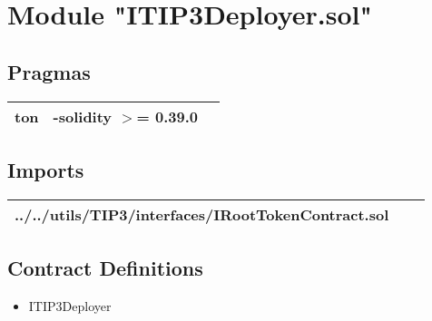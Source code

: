 
\section{Module "ITIP3Deployer.sol"}


\subsection{Pragmas}


\noindent\begin{tabular}{|l|l|p{5cm}|}\hline
ton & -solidity $>$= 0.39.0 &\\\hline
\end{tabular}


\subsection{Imports}


\noindent\begin{tabular}{|l|l|p{5cm}|}\hline
../../utils/TIP3/interfaces/IRootTokenContract.sol &\\\hline
\end{tabular}


\subsection{Contract Definitions}

\begin{itemize}
\item ITIP3Deployer
\end{itemize}
